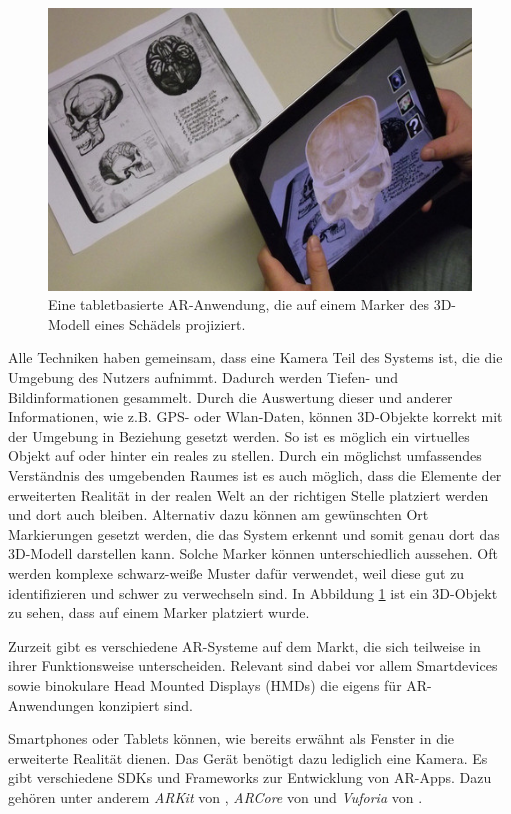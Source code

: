 \begin{figure}[!htb]
	\centering
	\includegraphics[width=0.5\linewidth]{images/App_iSkull,_an_augmented_human_skull.jpg}
	\caption{Eine tabletbasierte AR-Anwendung, die auf einem Marker des 3D-Modell  eines Schädels projiziert.}
	\label{img:ARMarker}
\end{figure}
\FloatBarrier

Alle Techniken haben gemeinsam, dass eine Kamera Teil des Systems ist, die die Umgebung des Nutzers aufnimmt. Dadurch werden Tiefen- und Bildinformationen gesammelt. Durch die Auswertung dieser und anderer Informationen, wie z.B. GPS- oder Wlan-Daten, können 3D-Objekte korrekt mit der Umgebung in Beziehung gesetzt werden. So ist es möglich ein virtuelles Objekt auf oder hinter ein reales zu stellen. Durch ein möglichst umfassendes Verständnis des umgebenden Raumes ist es auch möglich, dass die Elemente der erweiterten Realität in der realen Welt an der richtigen Stelle platziert werden und dort auch bleiben.
Alternativ dazu können am gewünschten Ort Markierungen gesetzt werden, die das System erkennt und somit genau dort das 3D-Modell darstellen kann. Solche Marker können unterschiedlich aussehen. Oft werden komplexe schwarz-weiße Muster dafür verwendet, weil diese gut zu identifizieren und schwer zu verwechseln sind. In Abbildung \ref{img:ARMarker} ist ein 3D-Objekt zu sehen, dass auf einem Marker platziert wurde. 

Zurzeit gibt es verschiedene AR-Systeme auf dem Markt, die sich teilweise in ihrer Funktionsweise unterscheiden. Relevant sind dabei vor allem Smartdevices sowie binokulare Head Mounted Displays (HMDs) die eigens für AR-Anwendungen konzipiert sind.

Smartphones oder Tablets können, wie bereits erwähnt als Fenster in die erweiterte Realität dienen. Das Gerät benötigt dazu lediglich eine Kamera. Es gibt verschiedene SDKs und Frameworks zur Entwicklung von AR-Apps. Dazu gehören unter anderem \textit{ARKit} von \cite{arKit}, \textit{ARCore} von \cite{ARCore} und \textit{Vuforia} von \cite{vuforia}.


